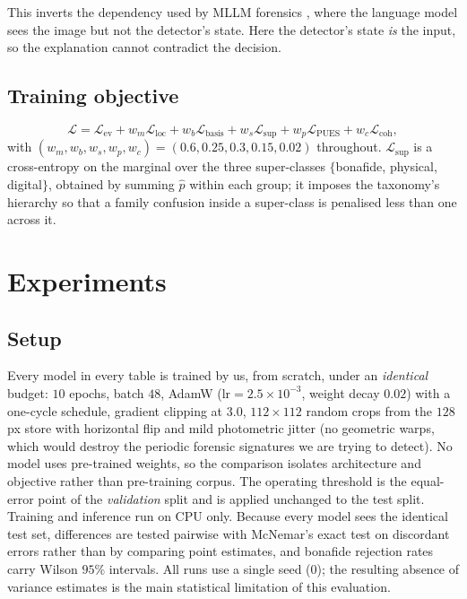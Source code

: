 \documentclass[conference]{IEEEtran}
\begin{document}
This inverts the dependency used by MLLM forensics
\cite{huang2024ffaa,guo2025m2f2det}, where the language model sees the image but not
the detector's state. Here the detector's state \emph{is} the input, so the
explanation cannot contradict the decision.

\subsection{Training objective}
\begin{equation}
\mathcal{L} = \mathcal{L}_{\text{ev}} + w_{m}\mathcal{L}_{\text{loc}}
+ w_{b}\mathcal{L}_{\text{basis}} + w_{s}\mathcal{L}_{\text{sup}}
+ w_{p}\mathcal{L}_{\text{PUES}} + w_{c}\mathcal{L}_{\text{coh}},
\end{equation}
with $(w_{m},w_{b},w_{s},w_{p},w_{c})=(0.6,0.25,0.3,0.15,0.02)$ throughout.
$\mathcal{L}_{\text{sup}}$ is a cross-entropy on the marginal over the three
super-classes $\{$bonafide, physical, digital$\}$, obtained by summing $\hat{p}$
within each group; it imposes the taxonomy's hierarchy so that a family confusion
inside a super-class is penalised less than one across it.

\section{Experiments}\label{sec:exp}

\subsection{Setup}
Every model in every table is trained by us, from scratch, under an
\emph{identical} budget: $10$ epochs, batch $48$, AdamW
($\text{lr}=2.5\times10^{-3}$, weight decay $0.02$) with a one-cycle schedule,
gradient clipping at $3.0$, $112\times112$ random crops from the $128$ px store
with horizontal flip and mild photometric jitter (no geometric warps, which would
destroy the periodic forensic signatures we are trying to detect). No model uses
pre-trained weights, so the comparison isolates architecture and objective rather
than pre-training corpus. The operating threshold is the equal-error point of the
\emph{validation} split and is applied unchanged to the test split. Training and
inference run on CPU only. Because every model sees the identical test set,
differences are tested pairwise with McNemar's exact test on discordant errors
rather than by comparing point estimates, and bonafide rejection rates carry Wilson
$95\%$ intervals. All runs use a single seed (0); the resulting absence of variance
estimates is the main statistical limitation of this evaluation.
\end{document}
